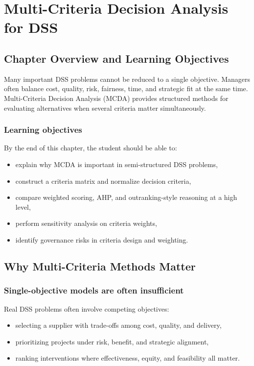 \chapter{Multi-Criteria Decision Analysis for DSS}
\label{ch:multi-criteria-decision-analysis-for-dss}

\section{Chapter Overview and Learning Objectives}

Many important DSS problems cannot be reduced to a single objective. Managers
often balance cost, quality, risk, fairness, time, and strategic fit at the
same time. Multi-Criteria Decision Analysis (MCDA) provides structured methods
for evaluating alternatives when several criteria matter simultaneously.

\subsection*{Learning objectives}
By the end of this chapter, the student should be able to:
\begin{itemize}
  \item explain why MCDA is important in semi-structured DSS problems,
  \item construct a criteria matrix and normalize decision criteria,
  \item compare weighted scoring, AHP, and outranking-style reasoning at a high
  level,
  \item perform sensitivity analysis on criteria weights,
  \item identify governance risks in criteria design and weighting.
\end{itemize}

\section{Why Multi-Criteria Methods Matter}

\subsection{Single-objective models are often insufficient}
Real DSS problems often involve competing objectives:
\begin{itemize}
  \item selecting a supplier with trade-offs among cost, quality, and delivery,
  \item prioritizing projects under risk, benefit, and strategic alignment,
  \item ranking interventions where effectiveness, equity, and feasibility all
  matter.
\end{itemize}

